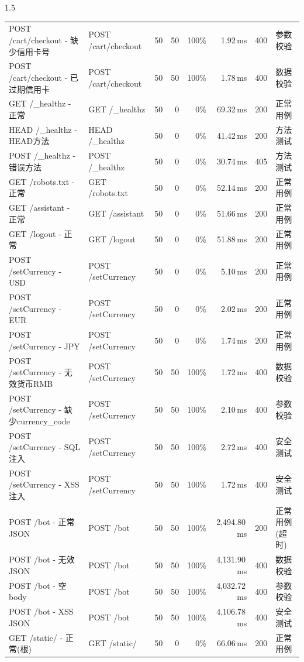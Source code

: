 \documentclass[a4paper,12pt]{report}
\begin{document}
\begin{spacing}{1.5}
\begin{appendices}
\begin{table}[htbp]
{\begin{tabular}{llrrrrrl}
				POST /cart/checkout - 缺少信用卡号 & POST /cart/checkout & 50 & 50 & 100\% & 1.92\,ms & 400 & 参数校验 \\
				POST /cart/checkout - 已过期信用卡 & POST /cart/checkout & 50 & 50 & 100\% & 1.78\,ms & 400 & 数据校验 \\
				GET /\_healthz - 正常 & GET /\_healthz & 50 & 0 & 0\% & 69.32\,ms & 200 & 正常用例 \\
				HEAD /\_healthz - HEAD方法 & HEAD /\_healthz & 50 & 0 & 0\% & 41.42\,ms & 200 & 方法测试 \\
				POST /\_healthz - 错误方法 & POST /\_healthz & 50 & 0 & 0\% & 30.74\,ms & 405 & 方法测试 \\
				GET /robots.txt - 正常 & GET /robots.txt & 50 & 0 & 0\% & 52.14\,ms & 200 & 正常用例 \\
				GET /assistant - 正常 & GET /assistant & 50 & 0 & 0\% & 51.66\,ms & 200 & 正常用例 \\
				GET /logout - 正常 & GET /logout & 50 & 0 & 0\% & 51.88\,ms & 200 & 正常用例 \\
				POST /setCurrency - USD & POST /setCurrency & 50 & 0 & 0\% & 5.10\,ms & 200 & 正常用例 \\
				POST /setCurrency - EUR & POST /setCurrency & 50 & 0 & 0\% & 2.02\,ms & 200 & 正常用例 \\
				POST /setCurrency - JPY & POST /setCurrency & 50 & 0 & 0\% & 1.74\,ms & 200 & 正常用例 \\
				POST /setCurrency - 无效货币RMB & POST /setCurrency & 50 & 50 & 100\% & 1.72\,ms & 400 & 数据校验 \\
				POST /setCurrency - 缺少currency\_code & POST /setCurrency & 50 & 50 & 100\% & 2.10\,ms & 400 & 参数校验 \\
				POST /setCurrency - SQL注入 & POST /setCurrency & 50 & 50 & 100\% & 2.72\,ms & 400 & 安全测试 \\
				POST /setCurrency - XSS注入 & POST /setCurrency & 50 & 50 & 100\% & 1.72\,ms & 400 & 安全测试 \\
				POST /bot - 正常JSON & POST /bot & 50 & 50 & 100\% & 2,494.80\,ms & 200 & 正常用例(超时) \\
				POST /bot - 无效JSON & POST /bot & 50 & 50 & 100\% & 4,131.90\,ms & 400 & 数据校验 \\
				POST /bot - 空body & POST /bot & 50 & 50 & 100\% & 4,032.72\,ms & 400 & 参数校验 \\
				POST /bot - XSS JSON & POST /bot & 50 & 50 & 100\% & 4,106.78\,ms & 400 & 安全测试 \\
				GET /static/ - 正常(根) & GET /static/ & 50 & 0 & 0\% & 66.06\,ms & 200 & 正常用例 \\

\end{tabular}}
\end{table}
\end{appendices}
\end{spacing}
\end{document}

